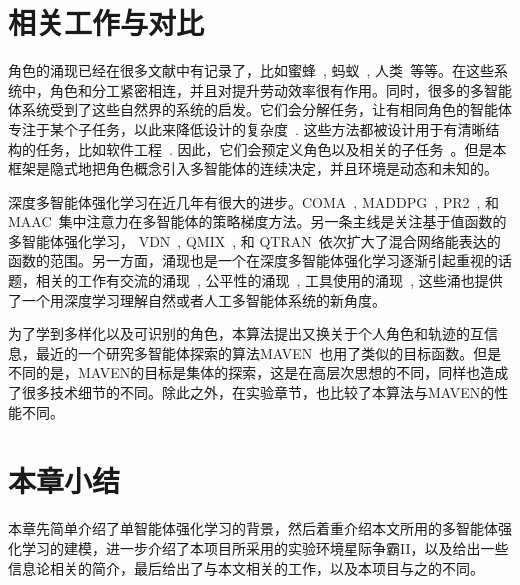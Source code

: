 \section{相关工作与对比}
角色的涌现已经在很多文献中有记录了，比如蜜蜂~\cite{jeanson2005emergence}, 蚂蚁~\cite{gordon1996organization}, 人类~\cite{butler2012condensed}等等。在这些系统中，角色和分工紧密相连，并且对提升劳动效率很有作用。同时，很多的多智能体系统受到了这些自然界的系统的启发。它们会分解任务，让有相同角色的智能体专注于某个子任务，以此来降低设计的复杂度~\cite{wooldridge2000gaia, omicini2000soda, padgham2002prometheus, pavon2003agent, cossentino2005passi, zhu2008role, spanoudakis2010using, deloach2010mase, bonjean2014adelfe}. 这些方法都被设计用于有清晰结构的任务，比如软件工程~\cite{bresciani2004tropos}. 因此，它们会预定义角色以及相关的子任务~\cite{ Lhaksmana2018role}。但是本框架是隐式地把角色概念引入多智能体的连续决定，并且环境是动态和未知的。

深度多智能体强化学习在近几年有很大的进步。COMA~\citep{foerster2018counterfactual}, MADDPG~\citep{lowe2017multi}, PR2~\citep{wen2019probabilistic}, 和MAAC~\cite{iqbal2019actor}集中注意力在多智能体的策略梯度方法。另一条主线是关注基于值函数的多智能体强化学习， VDN~\citep{sunehag2018value}, QMIX~\citep{rashid2018qmix}, 和 QTRAN~\citep{son2019qtran}依次扩大了混合网络能表达的函数的范围。另一方面，涌现也是一个在深度多智能体强化学习逐渐引起重视的话题，相关的工作有交流的涌现~\cite{foerster2016learning, lazaridou2017multi, das2017learning, mordatch2018emergence}, 公平性的涌现~\cite{jiang2019learning}, 工具使用的涌现~\cite{baker2020emergent}, 这些涌也提供了一个用深度学习理解自然或者人工多智能体系统的新角度。

为了学到多样化以及可识别的角色，本算法提出又换关于个人角色和轨迹的互信息，最近的一个研究多智能体探索的算法MAVEN~\cite{mahajan2019maven}也用了类似的目标函数。但是不同的是，MAVEN的目标是集体的探索，这是在高层次思想的不同，同样也造成了很多技术细节的不同。除此之外，在实验章节，也比较了本算法与MAVEN的性能不同。

\section{本章小结}
本章先简单介绍了单智能体强化学习的背景，然后着重介绍本文所用的多智能体强化学习的建模，进一步介绍了本项目所采用的实验环境星际争霸II，以及给出一些信息论相关的简介，最后给出了与本文相关的工作，以及本项目与之的不同。
